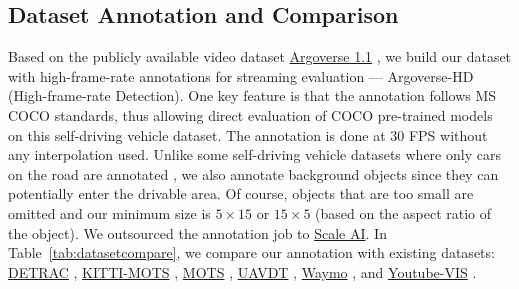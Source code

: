 \subsection{Dataset Annotation and Comparison}
\label{app:datasetcompare}

Based on the publicly available video dataset \href{https://www.argoverse.org/}{Argoverse 1.1} \cite{Argoverse}, we build our dataset with high-frame-rate annotations for streaming evaluation --- Argoverse-HD (High-frame-rate Detection). One key feature is that the annotation follows MS COCO \cite{lin2014microsoft} standards, thus allowing direct evaluation of COCO pre-trained models on this self-driving vehicle dataset. The annotation is done at 30 FPS without any interpolation used. Unlike some self-driving vehicle datasets where only cars on the road are annotated \cite{Voigtlaender19CVPR_MOTS}, we also annotate background objects since they can potentially enter the drivable area. Of course, objects that are too small are omitted and our minimum size is $5 \times 15$ or $15 \times 5$ (based on the aspect ratio of the object). We outsourced the annotation job to \href{https://scale.com/}{Scale AI}. In Table~\ref{tab:datasetcompare}, we compare our annotation with existing datasets:
\href{https://detrac-db.rit.albany.edu/Tracking}{DETRAC} \cite{DETRAC:CoRR:WenDCLCQLYL15},
\href{http://www.vision.rwth-aachen.de/page/mots}{KITTI-MOTS} \cite{Voigtlaender19CVPR_MOTS},
\href{http://www.vision.rwth-aachen.de/page/mots}{MOTS} \cite{Voigtlaender19CVPR_MOTS},
\href{https://sites.google.com/site/daviddo0323/projects/uavdt}{UAVDT} \cite{Du2018TheUA},
\href{https://waymo.com/open/about/}{Waymo} \cite{sun2019scalability}, and
\href{https://youtube-vos.org/dataset/vis/}{Youtube-VIS} \cite{Yang2019VideoIS}.

